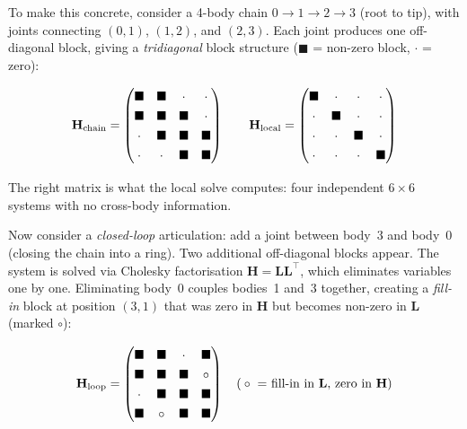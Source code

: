 \documentclass[11pt,a4paper]{article}
\begin{document}
To make this concrete, consider a 4-body chain $0 \to 1 \to 2 \to 3$ (root
to tip), with joints connecting $(0,1)$, $(1,2)$, and $(2,3)$.  Each joint
produces one off-diagonal block, giving a \emph{tridiagonal} block structure
($\blacksquare$ = non-zero block, $\cdot$ = zero):

\[
\mathbf{H}_\text{chain} =
\renewcommand\arraystretch{1.3}
\begin{pmatrix}
  \blacksquare & \blacksquare & \cdot        & \cdot        \\
  \blacksquare & \blacksquare & \blacksquare & \cdot        \\
  \cdot        & \blacksquare & \blacksquare & \blacksquare \\
  \cdot        & \cdot        & \blacksquare & \blacksquare
\end{pmatrix}
\qquad
\mathbf{H}_\text{local} =
\begin{pmatrix}
  \blacksquare & \cdot        & \cdot        & \cdot        \\
  \cdot        & \blacksquare & \cdot        & \cdot        \\
  \cdot        & \cdot        & \blacksquare & \cdot        \\
  \cdot        & \cdot        & \cdot        & \blacksquare
\end{pmatrix}
\]

The right matrix is what the local solve computes: four independent $6\times
6$ systems with no cross-body information.

Now consider a \emph{closed-loop} articulation: add a joint between body~3
and body~0 (closing the chain into a ring).  Two additional off-diagonal
blocks appear.  The system is solved via Cholesky factorisation
$\mathbf{H} = \mathbf{L}\mathbf{L}^\top$, which eliminates variables one by
one.  Eliminating body~0 couples bodies~1 and~3 together, creating a
\emph{fill-in} block at position $(3,1)$ that was zero in $\mathbf{H}$ but
becomes non-zero in $\mathbf{L}$ (marked $\circ$):

\[
\mathbf{H}_\text{loop} =
\renewcommand\arraystretch{1.3}
\begin{pmatrix}
  \blacksquare & \blacksquare & \cdot        & \blacksquare \\
  \blacksquare & \blacksquare & \blacksquare & \circ        \\
  \cdot        & \blacksquare & \blacksquare & \blacksquare \\
  \blacksquare & \circ        & \blacksquare & \blacksquare
\end{pmatrix}
\quad \text{(}\circ\text{ = fill-in in } \mathbf{L}\text{, zero in }\mathbf{H}\text{)}
\]
\end{document}
